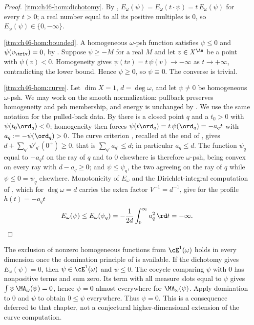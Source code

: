 \begin{proof}
\cref{itm:ch46-hom:dichotomy}.  By ,
$E_\omega(\psi)=E_\omega(t\cdot\psi)=t\,E_\omega(\psi)$ for every
$t>0$; a real number equal to all its positive multiples is $0$, so
$E_\omega(\psi)\in\{0,-\infty\}$.

\cref{itm:ch46-hom:bounded}.  A homogeneous $\omega$-psh function
satisfies $\psi\le0$ and $\psi(v_{\triv})=0$, by
.  Suppose $\psi\ge-M$ for a
real $M$ and let $v\in X^{\An}$ be a point with $\psi(v)<0$.
Homogeneity gives $\psi(tv)=t\,\psi(v)\to-\infty$ as $t\to+\infty$,
contradicting the lower bound.  Hence $\psi\ge0$, so $\psi\equiv0$.
The converse is trivial.

\cref{itm:ch46-hom:curve}. Let $\dim X=1$, $d=\deg\omega$, and let
$\psi\ne0$ be homogeneous $\omega$-psh. We may work on the smooth
normalization: pullback preserves homogeneity and psh membership, and
energy is unchanged by \cite[Proposition~7.7(iv)]{BJ22}.
We use the same notation for the pulled-back data.  By
 there is a closed point $q$ and a
$t_0>0$ with $\psi(t_0\ord_q)<0$; homogeneity then forces
$\psi(t\ord_q)=t\,\psi(\ord_q)=-a_qt$ with
$a_q:=-\psi(\ord_q)>0$.  The curve criterion
\cite[Example~4.13]{BJ22}, recalled at the end of
, gives
$d+\sum_{q'}\psi'_{q'}(0^+)\ge0$, that is $\sum_{q'}a_{q'}\le d$; in
particular $a_q\le d$.  The function
$\psi_q$ equal to $-a_qt$ on the ray of $q$ and to $0$
elsewhere is therefore $\omega$-psh, being convex on every ray with
$d-a_q\ge0$; and $\psi\le\psi_q$, the two
agreeing on the ray of $q$ while $\psi\le0=\psi_q$ elsewhere.
Monotonicity of $E_\omega$ and the Dirichlet-integral computation of
, which for $\deg\omega=d$ carries the extra
factor $V^{-1}=d^{-1}$, give for the profile $h(t)=-a_qt$
\[
 E_\omega(\psi)\le E_\omega(\psi_q)
 =-\frac1{2d}\int_0^\infty a_q^2\,\rd t=-\infty .
\]
\end{proof}

\begin{remark}
\label{rem:ch46-homogeneous-higher}
The exclusion of nonzero homogeneous functions from $\cE^1(\omega)$
holds in every dimension once the domination principle of
 is available. If the dichotomy gives
$E_\omega(\psi)=0$, then $\psi\in\cE^1(\omega)$ and $\psi\le0$.
The cocycle comparing $\psi$ with $0$ has nonpositive terms and sum zero.
Its term with all measure slots equal to $\psi$ gives
$\int\psi\,\MA_\omega(\psi)=0$, hence $\psi=0$ almost everywhere
for $\MA_\omega(\psi)$. Apply domination to $0$ and $\psi$ to obtain
$0\le\psi$ everywhere. Thus $\psi=0$.
This is a consequence deferred to that chapter, not a conjectural
higher-dimensional extension of the curve computation.
\end{remark}

